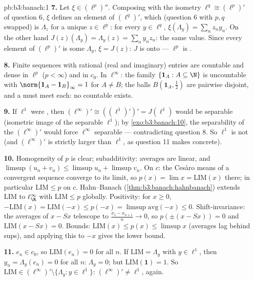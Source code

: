 \begin{solution}{pb:b3:banach:1}
\textbf{7.} Let $\xi \in (\ell^p)''$. Composing with the
isometry $\ell^q \cong (\ell^p)'$ of question 6, $\xi$ defines
an element of $(\ell^q)'$, which (question 6 with $p, q$
swapped) is $\Lambda_z$ for a unique $z \in \ell^p$: for every
$y \in \ell^q$, $\xi(\Lambda_y) = \sum_nz_ny_n$. On the other
hand $J(z)(\Lambda_y) = \Lambda_y(z) = \sum_ny_nz_n$: the same
value. Since every element of $(\ell^p)'$ is some $\Lambda_y$,
$\xi = J(z)$: $J$ is onto --- $\ell^p$ is .

\textbf{8.} Finite sequences with rational (real and imaginary)
entries are countable and dense in $\ell^p$ ($p < \infty$) and
in $c_0$. In $\ell^\infty$: the family $\{\mathbf 1_A : A
\subseteq \N\}$ is uncountable with $\norm{\mathbf 1_A -
\mathbf 1_B}_\infty = 1$ for $A \neq B$; the balls $B(\mathbf
1_A, \frac12)$ are pairwise disjoint, and a  must meet
each: no countable  exists.

\textbf{9.} If $\ell^1$ were , then $(\ell^\infty)'
\cong ((\ell^1)')' = J(\ell^1)$ would be separable (isometric
image of the separable $\ell^1$); by
\cref{exo:b3:banach:10}, the separability of the 
$(\ell^\infty)'$ would force $\ell^\infty$ separable ---
contradicting question 8. So $\ell^1$ is not  (and
$(\ell^\infty)'$ is strictly larger than $\ell^1$, as question
11 makes concrete).

\textbf{10.} Homogeneity of $p$ is clear; subadditivity:
averages are linear, and $\limsup(u_n + v_n) \leq \limsup u_n +
\limsup v_n$. On $c$: the Ces\`aro means of a convergent
sequence converge to its limit, so $p(x) = \lim x =
\mathrm{LIM}(x)$ there; in particular $\mathrm{LIM} \leq p$ on
$c$. Hahn--Banach (\cref{thm:b3:banach:hahnbanach}) extends
$\mathrm{LIM}$ to $\ell^\infty_\R$ with $\mathrm{LIM} \leq p$
globally. Positivity: for $x \geq 0$, $-\mathrm{LIM}(x) =
\mathrm{LIM}(-x) \leq p(-x) = \limsup\text{avg}(-x) \leq 0$.
Shift-invariance: the averages of $x - Sx$ telescope to
$\frac{x_1 - x_{n+1}}n \to 0$, so $p(\pm(x - Sx)) = 0$ and
$\mathrm{LIM}(x - Sx) = 0$. Bounds: $\mathrm{LIM}(x) \leq p(x)
\leq \limsup x$ (averages lag behind sups), and applying this
to $-x$ gives the lower bound.

\textbf{11.} $e_n \in c_0$, so $\mathrm{LIM}(e_n) = 0$ for all
$n$. If $\mathrm{LIM} = \Lambda_y$ with $y \in \ell^1$, then
$y_n = \Lambda_y(e_n) = 0$ for all $n$: $\Lambda_y = 0$; but
$\mathrm{LIM}(\mathbf 1) = 1$. So $\mathrm{LIM} \in
(\ell^\infty)' \setminus \{\Lambda_y : y \in \ell^1\}$:
$(\ell^\infty)' \neq \ell^1$, again.


\end{solution}
